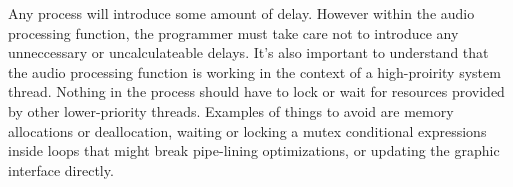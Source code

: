 Any process will introduce some amount of delay. However within the audio processing function, the programmer must take care not to introduce any unneccessary or uncalculateable delays. It's also important to understand that the audio processing function is working in the context of a high-proirity system thread. Nothing in the process should have to lock or wait for resources provided by other lower-priority threads. Examples of things to avoid are memory allocations or deallocation, waiting or locking a mutex conditional expressions inside loops that might break pipe-lining optimizations\cite{realtime-architectures}, or updating the graphic interface directly.

